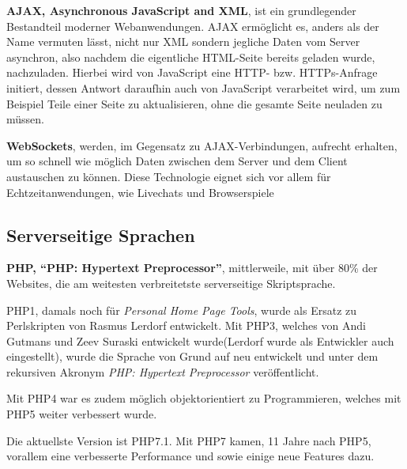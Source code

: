 \documentclass[a4paper,12pt]{scrartcl}      %
\let\oldcite\cite
\renewcommand{\cite}[1]{\textsuperscript{\oldcite{#1}}}
\newcommand{\spacer}{\par\bigskip\noindent}
\begin{document}
	\spacer\textbf{AJAX, Asynchronous JavaScript and XML}, ist ein grundlegender Bestandteil moderner Webanwendungen. AJAX ermöglicht es, anders als der Name vermuten lässt, nicht nur XML sondern jegliche Daten vom Server asynchron, also nachdem die eigentliche HTML-Seite bereits geladen wurde, nachzuladen. Hierbei wird von JavaScript eine HTTP- bzw. HTTPs-Anfrage initiert, dessen Antwort daraufhin auch von JavaScript verarbeitet wird, um zum Beispiel Teile einer Seite zu aktualisieren, ohne die gesamte Seite neuladen zu müssen.\cite{ajaxWiki}\par
	
	\spacer\textbf{WebSockets}, werden, im Gegensatz zu AJAX-Verbindungen, aufrecht erhalten, um so schnell wie möglich Daten zwischen dem Server und dem Client austauschen zu können. Diese Technologie eignet sich vor allem für Echtzeitanwendungen, wie Livechats und Browserspiele\cite{websocketWiki}\par
	
	\subsection{Serverseitige Sprachen}
	
	\spacer\textbf{PHP, ``PHP: Hypertext Preprocessor''}, mittlerweile, mit über 80\% der Websites, die am weitesten verbreitetste serverseitige Skriptsprache.\cite{phpCoverage}\par
	PHP1, damals noch für \emph{Personal Home Page Tools}, wurde als Ersatz zu Perlskripten von Rasmus Lerdorf entwickelt. Mit PHP3, welches von Andi Gutmans und Zeev Suraski entwickelt wurde(Lerdorf wurde als Entwickler auch eingestellt), wurde die Sprache von Grund auf neu entwickelt und unter dem rekursiven Akronym \emph{PHP: Hypertext Preprocessor} veröffentlicht.\par
	Mit PHP4 war es zudem möglich objektorientiert zu Programmieren, welches mit PHP5 weiter verbessert wurde.\par
	Die aktuellste Version ist PHP7.1. Mit PHP7 kamen, 11 Jahre nach PHP5, vorallem eine verbesserte Performance und sowie einige neue Features dazu.\cite{phpWiki}\par
	
\end{document}

